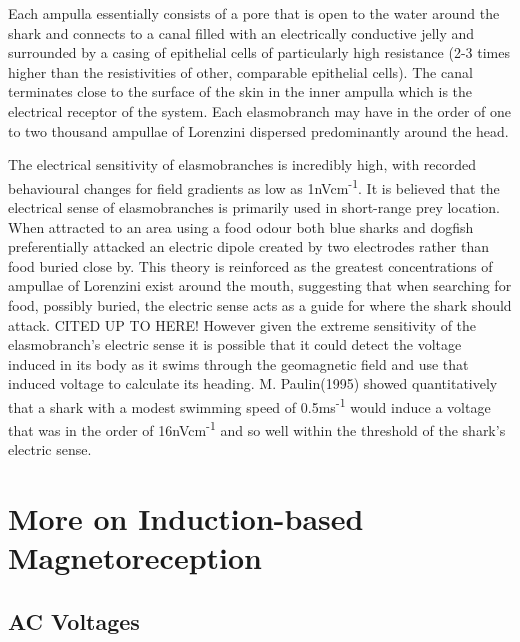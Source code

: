 \documentclass[12pt]{article}
\begin{document}
 Each ampulla essentially consists of a pore that is open to the water around the shark and connects to a canal filled with an electrically conductive jelly and surrounded by a casing of epithelial cells of particularly high resistance (2-3 times higher than the resistivities of other, comparable epithelial cells)\cite{Waltman:1966}. The canal terminates close to the surface of the skin in the inner ampulla which is the electrical receptor of the system\cite{Murray:1974}. Each elasmobranch may have in the order of one to two thousand ampullae of Lorenzini dispersed predominantly around the head.

The electrical sensitivity of elasmobranches is incredibly high, with recorded behavioural changes for field gradients as low as 1nVcm\textsuperscript{-1}\cite{Kajiura:2002}\cite{Kalmijn:1982}\cite{Murray:1974}. It is believed that the electrical sense of elasmobranches is primarily used in short-range prey location. When attracted to an area using a food odour both blue sharks and dogfish preferentially attacked an electric dipole created by two electrodes rather than food buried close by\cite{Kalmijn:1982}. This theory is reinforced as the greatest concentrations of ampullae of Lorenzini exist around the mouth, suggesting that when searching for food, possibly buried, the electric sense acts as a guide for where the shark should attack\cite{Murray:1974}. CITED UP TO HERE! However given the extreme sensitivity of the elasmobranch's electric sense it is possible that it could detect the voltage induced in its body as it swims through the geomagnetic field and use that induced voltage to calculate its heading. M. Paulin(1995) showed quantitatively that a shark with  a modest swimming speed of 0.5ms\textsuperscript{-1} would induce a voltage that was in the order of 16nVcm\textsuperscript{-1} and so well within the threshold of the shark's electric sense. 

\section{More on Induction-based Magnetoreception}
\subsection{AC Voltages}
\end{document}
